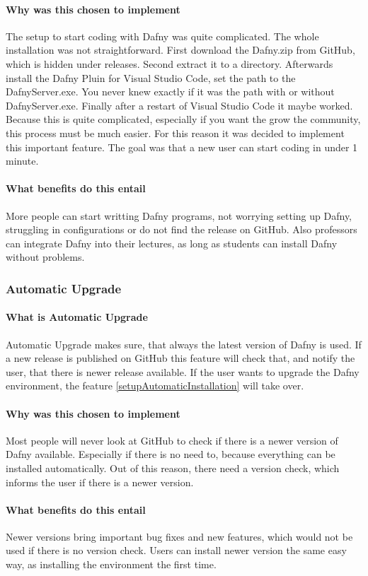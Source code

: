 \paragraph{Why was this chosen to implement}
The setup to start coding with Dafny was quite complicated. The whole installation was not straightforward. First download the Dafny.zip from GitHub, which is hidden under releases. Second extract it to a directory. Afterwards install the Dafny Pluin for Visual Studio Code, set the path to the DafnyServer.exe. You never knew exactly if it was the path with or without DafnyServer.exe. Finally after a restart of Visual Studio Code it maybe worked. \newline
Because this is quite complicated, especially if you want the grow the community, this process must be much easier. For this reason it was decided to implement this important feature. The goal was that a new user can start coding in under 1 minute. 

\paragraph{What benefits do this entail}
More people can start writting Dafny programs, not worrying setting up Dafny, struggling in configurations or do not find the release on GitHub. Also professors can integrate Dafny into their lectures, as long as students can install Dafny without problems. 


\subsubsection{Automatic Upgrade} \label{setupAutomaticUpgrade}

\paragraph{What is Automatic Upgrade}
Automatic Upgrade makes sure, that always the latest version of Dafny is used. If a new release is published on GitHub this feature will check that, and notify the user, that there is newer release available. If the user wants to upgrade the Dafny environment, the feature \ref{setupAutomaticInstallation} will take over. 

\paragraph{Why was this chosen to implement}
Most people will never look at GitHub to check if there is a newer version of Dafny available. Especially if there is no need to, because everything can be installed automatically. Out of this reason, there need a version check, which informs the user if there is a newer version. 


\paragraph{What benefits do this entail}
Newer versions bring important bug fixes and new features, which would not be used if there is no version check. Users can install newer version the same easy way, as installing the environment the first time.  

